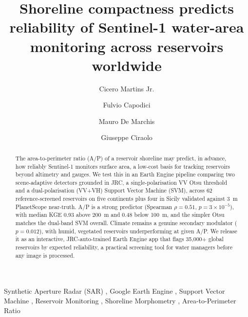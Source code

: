 \documentclass[review,12pt,authoryear]{elsarticle}
\begin{document}
\begin{frontmatter}

\title{Shoreline compactness predicts reliability of Sentinel-1 water-area monitoring
       across reservoirs worldwide}

\author[unipa]{Cicero Martins Jr.}

\author[unipa]{Fulvio Capodici}
\author[unipa]{Mauro De Marchis}
\author[unipa]{Giuseppe Ciraolo}


\begin{abstract}
The area-to-perimeter ratio (A/P) of a reservoir shoreline may predict, in
advance, how reliably Sentinel-1 monitors surface area, a low-cost basis for
tracking reservoirs beyond altimetry and gauges. We test this
in an Earth Engine pipeline comparing two scene-adaptive detectors grounded in
JRC, a single-polarisation VV Otsu threshold and a dual-polarisation (VV+VH)
Support Vector Machine (SVM), across 62 reference-screened reservoirs on five
continents plus four in Sicily validated against 3~m PlanetScope near-truth.
A/P is a strong predictor (Spearman $\rho = 0.51$, $p = 3\times10^{-5}$), with
median KGE 0.93 above 200~m and 0.48 below 100~m, and the simpler Otsu matches
the dual-band SVM overall. Climate remains a genuine secondary modulator
($p=0.012$), with humid, vegetated reservoirs underperforming at given A/P.
We release it as an interactive, JRC-auto-trained Earth Engine app
that flags 35,000+ global reservoirs by expected reliability, a practical
screening tool for water managers before any image is processed.
\end{abstract}

\begin{keyword}
Synthetic Aperture Radar (SAR) \sep
Google Earth Engine \sep
Support Vector Machine \sep
Reservoir Monitoring \sep
Shoreline Morphometry \sep
Area-to-Perimeter Ratio
\end{keyword}

\end{frontmatter}
\end{document}
